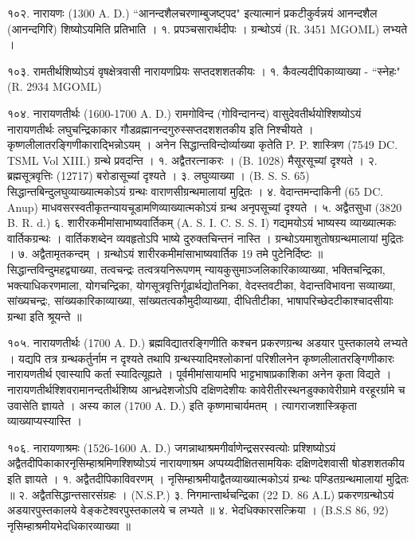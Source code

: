 १०२. नारायणः (1300 A. D.)
``आनन्दशैलचरणाम्बुजष्ट्पद" इत्यात्मानं प्रकटीकुर्वन्नयं आनन्दशैल (आनन्दगिरि) शिष्योऽयमिति प्रतिभाति ।
१. प्रपञ्चसारार्थदीपः । ग्रन्थोऽयं (R. 3451 MGOML) लभ्यते ।

१०३.
रामतीर्थशिष्योऽयं वृषक्षेत्रवासी नारायणप्रियः सप्तदशशतकीयः ।
१. कैवल्यदीपिकाव्याख्या - ``स्नेहः" (R. 2934 MGOML)

१०४. नारायणतीर्थः (1600-1700 A. D.)
रामगोविन्द (गोविन्दानन्द) वासुदेवतीर्थयोश्शिष्योऽयं नारायणतीर्थः लघुचन्द्रिकाकार गौडव्रह्मानन्दगुरुस्सप्तदशशतकीय इति निश्चीयते । कृष्णलीलातरङ्गिणीकाराद्भिन्नोऽयम् । अनेन सिद्धान्तविन्दोर्व्याख्या कृतेति P. P. शास्त्रिण (7549 DC. TSML Vol XIII.) ग्रन्थे प्रवदन्ति ।
१. अद्वैतरत्नाकरः । (B. 1028) मैसूरसूच्यां दृश्यते ।
२. ब्रह्मसूत्रवृत्तिः (12717) बरोडासूच्यां दृश्यते ।
३. लघुव्याख्या । (B. S. S. 65) सिद्धान्तबिन्दुलघुव्याख्यात्मकोऽयं ग्रन्थः वाराणसीग्रन्थमालायां मुद्रितः ।
४. वेदान्तमन्दाकिनी (65 DC. Anup) माधवसरस्वतीकृतन्यायचूडामणिव्याख्यात्मकोऽयं ग्रन्थ अनृपसूच्यां दृश्यते ।
५. अद्वैतसुधा (3820 B. R. d.)
६. शारीरकमीमांसाभाष्यवार्तिकम् (A. S. I. C. S. S. I) गद्यमयोऽयं भाष्यस्य व्याख्यात्मकः वार्तिकग्रन्थः । वार्तिकशब्देन व्यवहृतोऽपि भाष्ये दुरुक्तचिन्तनं नास्ति । ग्रन्थोऽयमाशुतोषग्रन्थमालायां मुद्रितः ।
७. अद्वैतामृतकन्दम् । ग्रन्थोऽयं शारीरकमीमांसाभाष्यवार्तिक 19 तमे पुटेनिर्दिष्टः ॥
सिद्धान्तविन्दुमहद्व्याख्या, तत्वचन्द्रः तत्वत्रयनिरूपणम् न्यायकुसुमाञ्जलिकारिकाव्याख्या, भक्तिचन्द्रिका, भक्त्याधिकरणमाला, योगचन्द्रिका, योगसूत्रवृत्तिर्गूढार्थद्योतनिका, वेदस्तवटीका, वेदान्तविभावना सव्याख्या, सांख्यचन्द्रः, सांख्यकारिकाव्याख्या, सांख्यतत्वकौमुदीव्याख्या, दीधितीटीका, भाषापरिच्छेदटीकाश्चादसीयाः ग्रन्था इति श्रूयन्ते ॥

१०५. नारायणतीर्थः (1700 A. D.)
ब्रह्मविद्यातरङ्गिणीति कश्चन प्रकरणग्रन्थ अडयार पुस्तकालये लभ्यते । यद्यपि तत्र ग्रन्थकर्तुर्नाम न दृश्यते तथापि ग्रन्थस्यादिमश्लोकानां परिशीलनेन कृष्णलीलातरङ्गिणीकारः नारायणतीर्थ एवास्यापि कर्ता स्यादित्यूह्यते । पूर्वमीमांसायामपि भाट्टभाषाप्रकाशिका अनेन कृता विद्यते । नारायणतीर्थश्शिवरामानन्दतीर्थशिष्य आन्ध्रदेशजोऽपि दक्षिणदेशीयः कावेरीतीरस्थनडुक्कावेरीग्रामे वरहूरर्ग्रामे च उवासेति ज्ञायते । अस्य काल (1700 A. D.) इति कृष्णमाचार्यमतम् । त्यागराजशास्त्रिकृता व्याख्याप्यस्यास्ति ।

१०६. नारायणाश्रमः (1526-1600 A. D.)
जगन्नाथाश्रमगीर्वाणेन्द्रसरस्वत्योः प्रश्शिष्योऽयं अद्वैतदीपिकाकारनृसिम्हाश्रमिणश्शिष्योऽयं नारायणाश्रम अप्पय्यदीक्षितसामयिकः दक्षिणदेशवासी षोडशशतकीय इति ज्ञायते ।
१. अद्वैतदीपिकाविवरणम् । नृसिम्हाश्रमीयाद्वैतव्याख्यात्मकोऽयं ग्रन्थः पण्डितग्रन्थमालायां मुद्रितः ॥
२. अद्वैतसिद्धान्तसारसंग्रहः । (N.S.P.)
३. निगमान्तार्थचन्द्रिका (22 D. 86 A.L) प्रकरणग्रन्थोऽयं अडयारपुस्तकालये वेङ्कटेश्वरपुस्तकालये च लभ्यते ॥
४. भेदधिक्कारसत्क्रिया । (B.S.S 86, 92) नृसिम्हाश्रमीयभेदधिकारव्याख्या ॥

